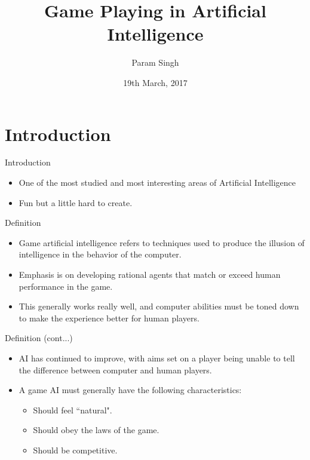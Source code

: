 \documentclass{beamer}
\title{Game Playing in Artificial Intelligence}
\author{Param Singh}
\institute[National Institute of Technology, Hamirpur]
{
  14MI517\\
  Computer Science and Engineering Department\\
  National Institute of Technology, Hamirpur\\
}
\date{19th March, 2017}
\begin{document}
\begin{frame}
  \titlepage
\end{frame}

\section{Introduction}

\begin{frame}{Introduction}
  \begin{itemize}
  \item {
    One of the most studied and most interesting areas of Artificial Intelligence
  }
  \item {
    Fun but a little hard to create.
  }
  \end{itemize}
\end{frame}


\begin{frame}{Definition}
  \begin{itemize}
  \item {
    Game artificial intelligence refers to techniques used to produce the illusion of intelligence in the behavior of the computer.
  }
  \item {
    Emphasis is on developing rational agents that match or exceed human performance in the game.
  }
  \item {
    This generally works really well, and computer abilities must be toned down to make the experience better for human players.
  }
  \end{itemize}
\end{frame}

\begin{frame}{Definition (cont...)}
  \begin{itemize}
  \item {
    AI has continued to improve, with aims set on a player being unable to tell the difference between computer and human players.
  }
  \item {
    A game AI must generally have the following characteristics:
    \begin{itemize}
      \item Should feel ``natural".
      \item Should obey the laws of the game.
      \item Should be competitive.
    \end{itemize}
  }
  \end{itemize}
\end{frame}
\end{document}
